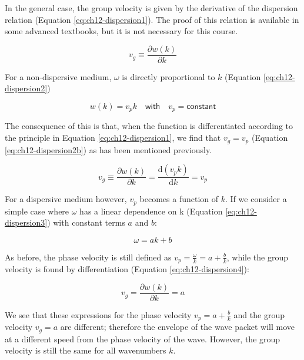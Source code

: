 \documentclass[
]{book}
\begin{document}
In the general case, the group velocity is given by the derivative of the dispersion relation (Equation \eqref{eq:ch12-dispersion1}). The proof of this relation is available in some advanced textbooks, but it is not necessary for this course.

\begin{equation}
v_g \equiv \frac{\partial w(k)}{\partial k}
\label{eq:ch12-dispersion1}
\end{equation}

For a non-dispersive medium, \(\omega\) is directly proportional to \(k\) (Equation \eqref{eq:ch12-dispersion2})

\begin{equation}
w(k) = v_p k \quad \textsf{with} \quad v_p = \textsf{constant}
\label{eq:ch12-dispersion2}
\end{equation}

The consequence of this is that, when the function is differentiated according to the principle in Equation \eqref{eq:ch12-dispersion1}, we find that \(v_g = v_p\) (Equation \eqref{eq:ch12-dispersion2b}) as has been mentioned previously.

\begin{equation}
v_g \equiv \frac{\partial w(k)}{\partial k} = \frac{\mathrm{d} (v_p k)}{\mathrm{d}k} = v_p
\label{eq:ch12-dispersion2b}
\end{equation}

For a dispersive medium however, \(v_p\) becomes a function of \(k\). If we consider a simple case where \(\omega\) has a linear dependence on k (Equation \eqref{eq:ch12-dispersion3}) with constant terms \(a\) and \(b\):

\begin{equation}
\omega = ak + b
\label{eq:ch12-dispersion3}
\end{equation}

As before, the phase velocity is still defined as \(v_p = \frac{\omega}{k} = a + \frac{b}{k}\), while the group velocity is found by differentiation (Equation \eqref{eq:ch12-dispersion4}):

\begin{equation}
v_g = \frac{\partial w(k)}{\partial k} = a
\label{eq:ch12-dispersion4}
\end{equation}

We see that these expressions for the phase velocity \(v_p = a + \frac{b}{k}\) and the group velocity \(v_g = a\) are different; therefore the envelope of the wave packet will move at a different speed from the phase velocity of the wave. However, the group velocity is still the same for all wavenumbers \(k\).
\end{document}
